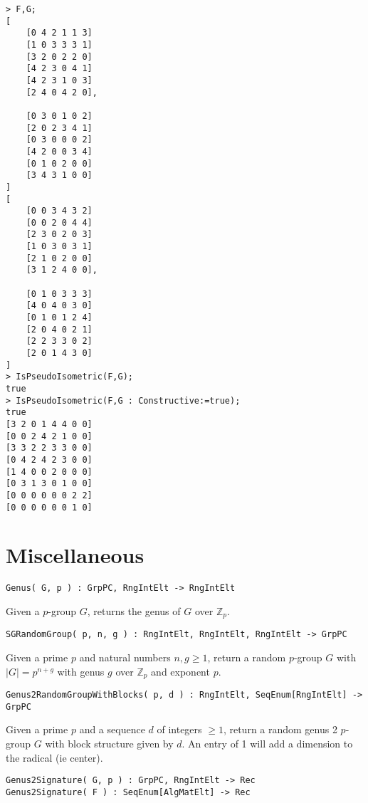\documentclass{amsart}
\begin{document}
\begin{lstlisting}[frame=single,basicstyle=\ttfamily\color{black!30!teal},backgroundcolor=\color{white!70!gray}]
> F,G;
[
    [0 4 2 1 1 3]
    [1 0 3 3 3 1]
    [3 2 0 2 2 0]
    [4 2 3 0 4 1]
    [4 2 3 1 0 3]
    [2 4 0 4 2 0],

    [0 3 0 1 0 2]
    [2 0 2 3 4 1]
    [0 3 0 0 0 2]
    [4 2 0 0 3 4]
    [0 1 0 2 0 0]
    [3 4 3 1 0 0]
]
[
    [0 0 3 4 3 2]
    [0 0 2 0 4 4]
    [2 3 0 2 0 3]
    [1 0 3 0 3 1]
    [2 1 0 2 0 0]
    [3 1 2 4 0 0],

    [0 1 0 3 3 3]
    [4 0 4 0 3 0]
    [0 1 0 1 2 4]
    [2 0 4 0 2 1]
    [2 2 3 3 0 2]
    [2 0 1 4 3 0]
]
> IsPseudoIsometric(F,G);
true
> IsPseudoIsometric(F,G : Constructive:=true);
true 
[3 2 0 1 4 4 0 0]
[0 0 2 4 2 1 0 0]
[3 3 2 2 3 3 0 0]
[0 4 2 4 2 3 0 0]
[1 4 0 0 2 0 0 0]
[0 3 1 3 0 1 0 0]
[0 0 0 0 0 0 2 2]
[0 0 0 0 0 0 1 0]
\end{lstlisting}

\section{Miscellaneous}

\color{blue}
\begin{verbatim}
Genus( G, p ) : GrpPC, RngIntElt -> RngIntElt
\end{verbatim}

\color{black}
Given a $p$-group $G$, returns the genus of $G$ over $\mathbb{Z}_p$.

\color{blue}
\begin{verbatim}
SGRandomGroup( p, n, g ) : RngIntElt, RngIntElt, RngIntElt -> GrpPC
\end{verbatim}

\color{black}
Given a prime $p$ and natural numbers $n,g\geq 1$, return a random $p$-group $G$ with $|G|=p^{n+g}$ with genus $g$ over $\mathbb{Z}_p$ and exponent $p$.

\color{blue}
\begin{verbatim}
Genus2RandomGroupWithBlocks( p, d ) : RngIntElt, SeqEnum[RngIntElt] -> GrpPC
\end{verbatim}

\color{black}
Given a prime $p$ and a sequence $d$ of integers $\geq 1$, return a random genus 2 $p$-group $G$ with block structure given by $d$. An entry of 1 will add a dimension to the radical (ie center).

\color{blue}
\begin{verbatim}
Genus2Signature( G, p ) : GrpPC, RngIntElt -> Rec
Genus2Signature( F ) : SeqEnum[AlgMatElt] -> Rec
\end{verbatim}
\end{document}
